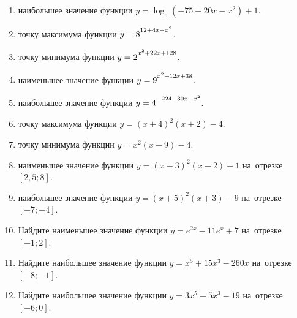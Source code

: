 \documentclass[a4paper,10pt]{article}
\begin{document}
\begin{enumerate}
\item {} наибольшее значение функции $y=\log_5\left(-75+20x-x^2\right)+1$.

\item {} точку максимума функции $y=8\strut^{12+4x-x^2}$.

\item {} точку минимума функции $y=2\strut^{x^2+22x+128}$.

\item {} наименьшее значение функции $y=9\strut^{x^2+12x+38}$.

\item {} наибольшее значение функции $y=4\strut^{-224-30x-x^2}$.

\item {} точку максимума функции $y=\left(x+4\right)^2\left(x+2\right)-4$.

\item {} точку минимума функции $y=x^2\left(x-9\right)-4$.

\item {} наименьшее значение функции $y=\left(x-3\right)^2\left(x-2\right)+1$ на~отрезке~$\left[2{,}5;8\right]$.

\item {} наибольшее значение функции $y=\left(x+5\right)^2\left(x+3\right)-9$ на~отрезке~$\left[-7;-4\right]$.

\item Найдите наименьшее значение функции $y=e^{2x}-11e^x+7$ на~отрезке~$\left[-1;2\right]$.

\item Найдите наибольшее значение функции $y=x^5+15x^3-260x$ на~отрезке~$\left[-8;-1\right]$.

\item Найдите наибольшее значение функции $y=3x^5-5x^3-19$ на~отрезке~$\left[-6;0\right]$.

\end{enumerate}
\end{document}

